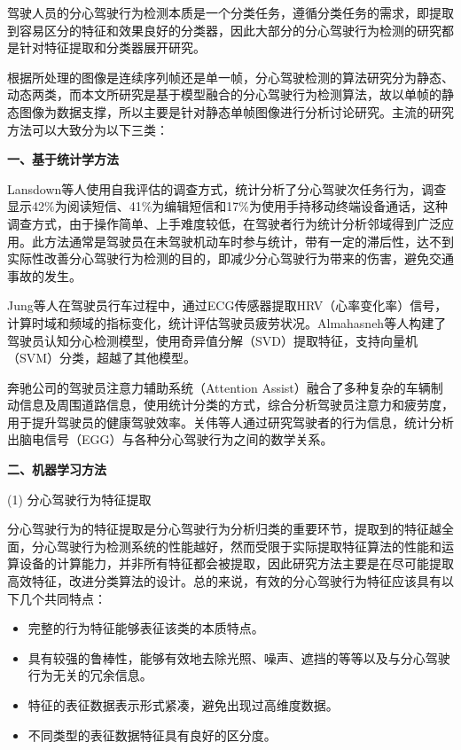 驾驶人员的分心驾驶行为检测本质是一个分类任务，遵循分类任务的需求，即提取到容易区分的特征和效果良好的分类器，因此大部分的分心驾驶行为检测的研究都是针对特征提取和分类器展开研究。

根据所处理的图像是连续序列帧还是单一帧，分心驾驶检测的算法研究分为静态、动态两类，而本文所研究是基于模型融合的分心驾驶行为检测算法，故以单帧的静态图像为数据支撑，所以主要是针对静态单帧图像进行分析讨论研究。主流的研究方法可以大致分为以下三类：

\textbf{一、基于统计学方法}

Lansdown等人\cite{11}使用自我评估的调查方式，统计分析了分心驾驶次任务行为，调查显示42\%为阅读短信、41\%为编辑短信和17\%为使用手持移动终端设备通话，这种调查方式，由于操作简单、上手难度较低，在驾驶者行为统计分析邻域得到广泛应用。此方法通常是驾驶员在未驾驶机动车时参与统计，带有一定的滞后性，达不到实际性改善分心驾驶行为检测的目的，即减少分心驾驶行为带来的伤害，避免交通事故的发生。

Jung等人\cite{12}在驾驶员行车过程中，通过ECG传感器提取HRV（心率变化率）信号，计算时域和频域的指标变化，统计评估驾驶员疲劳状况。Almahasneh等人\cite{28}构建了驾驶员认知分心检测模型，使用奇异值分解（SVD）提取特征，支持向量机（SVM）分类，超越了其他模型。

奔驰公司的驾驶员注意力辅助系统（Attention Assist）融合了多种复杂的车辆制动信息及周围道路信息，使用统计分类的方式，综合分析驾驶员注意力和疲劳度，用于提升驾驶员的健康驾驶效率\cite{7}。关伟等人\cite{14}通过研究驾驶者的行为信息，统计分析出脑电信号（EGG）与各种分心驾驶行为之间的数学关系。

\textbf{二、机器学习方法}

(1)	分心驾驶行为特征提取

分心驾驶行为的特征提取是分心驾驶行为分析归类的重要环节，提取到的特征越全面，分心驾驶行为检测系统的性能越好，然而受限于实际提取特征算法的性能和运算设备的计算能力，并非所有特征都会被提取，因此研究方法主要是在尽可能提取高效特征，改进分类算法的设计。总的来说，有效的分心驾驶行为特征应该具有以下几个共同特点：

\begin{itemize}
	\item 完整的行为特征能够表征该类的本质特点。
	\item 具有较强的鲁棒性，能够有效地去除光照、噪声、遮挡的等等以及与分心驾驶行为无关的冗余信息。
	\item 特征的表征数据表示形式紧凑，避免出现过高维度数据。
	\item 不同类型的表征数据特征具有良好的区分度。
\end{itemize}

